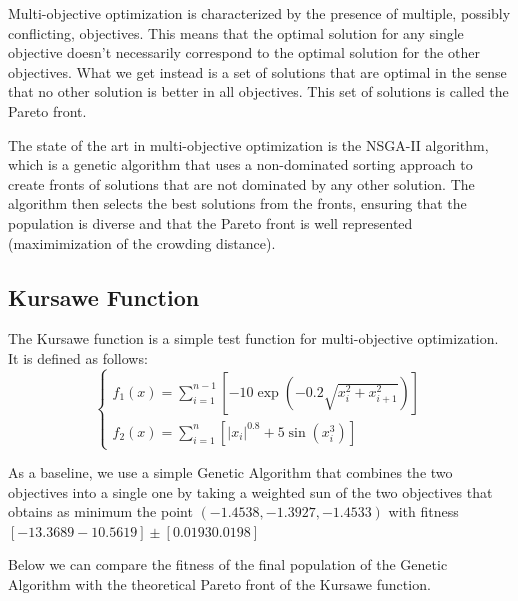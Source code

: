 Multi-objective optimization is characterized by the presence of multiple, possibly conflicting, objectives. This means that the optimal solution for any single objective doesn't necessarily correspond to the optimal solution for the other objectives. What we get instead is a set of solutions that are optimal in the sense that no other solution is better in all objectives. This set of solutions is called the Pareto front.

The state of the art in multi-objective optimization is the NSGA-II algorithm, which is a genetic algorithm that uses a non-dominated sorting approach to create fronts of solutions that are not dominated by any other solution. The algorithm then selects the best solutions from the fronts, ensuring that the population is diverse and that the Pareto front is well represented (maximimization of the crowding distance).

\subsection{Kursawe Function}
The Kursawe function is a simple test function for multi-objective optimization. It is defined as follows:
\begin{equation}
    \begin{cases}
        f_1(x) = \sum_{i=1}^{n-1} \left[ -10 \exp\left(-0.2\sqrt{x_i^2 + x_{i+1}^2}\right) \right] \\
        f_2(x) = \sum_{i=1}^{n} \left[ \left| x_i \right|^{0.8} + 5 \sin(x_i^3) \right]
    \end{cases}
\end{equation}

As a baseline, we use a simple Genetic Algorithm that combines the two objectives into a single one by taking a weighted sun of the two objectives that obtains as minimum the point $(-1.4538, -1.3927, -1.4533)$ with fitness $[-13.3689 -10.5619] \pm [0.0193 0.0198]$

Below we can compare the fitness of the final population of the Genetic Algorithm with the theoretical Pareto front of the Kursawe function.

